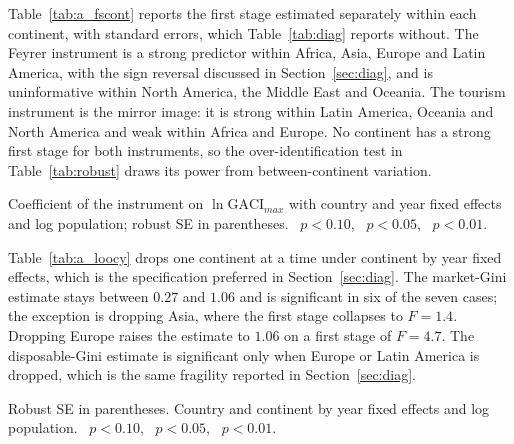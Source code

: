 Table~\ref{tab:a_fscont} reports the first stage estimated separately within each continent, with standard errors, which Table~\ref{tab:diag} reports without. The Feyrer instrument is a strong predictor within Africa, Asia, Europe and Latin America, with the sign reversal discussed in Section~\ref{sec:diag}, and is uninformative within North America, the Middle East and Oceania. The tourism instrument is the mirror image: it is strong within Latin America, Oceania and North America and weak within Africa and Europe. No continent has a strong first stage for both instruments, so the over-identification test in Table~\ref{tab:robust} draws its power from between-continent variation.

\begin{table}[H]\centering\caption{First stage estimated separately by continent.}\label{tab:a_fscont}
\begin{threeparttable}\small
\begin{tablenotes}\footnotesize\item Coefficient of the instrument on $\ln\mathrm{GACI}_{max}$ with country and year fixed effects and log population; robust SE in parentheses. \sym{*}~$p<0.10$, \sym{**}~$p<0.05$, \sym{***}~$p<0.01$.\end{tablenotes}\end{threeparttable}\end{table}

Table~\ref{tab:a_loocy} drops one continent at a time under continent by year fixed effects, which is the specification preferred in Section~\ref{sec:diag}. The market-Gini estimate stays between $0.27$ and $1.06$ and is significant in six of the seven cases; the exception is dropping Asia, where the first stage collapses to $F=1.4$. Dropping Europe raises the estimate to $1.06$ on a first stage of $F=4.7$. The disposable-Gini estimate is significant only when Europe or Latin America is dropped, which is the same fragility reported in Section~\ref{sec:diag}.

\begin{table}[H]\centering\caption{Leave-one-continent-out under continent by year fixed effects (Feyrer instrument).}\label{tab:a_loocy}
\begin{threeparttable}\small
\begin{tablenotes}\footnotesize\item Robust SE in parentheses. Country and continent by year fixed effects and log population. \sym{*}~$p<0.10$, \sym{**}~$p<0.05$, \sym{***}~$p<0.01$.\end{tablenotes}\end{threeparttable}\end{table}

